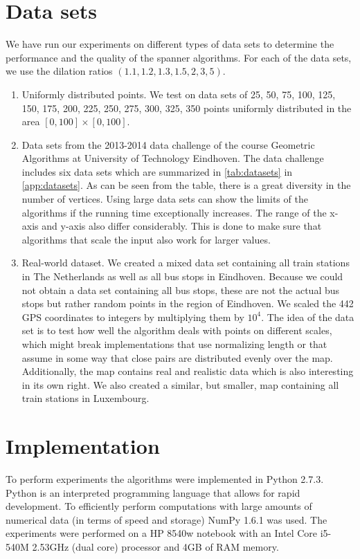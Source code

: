 \documentclass[a4paper,twoside,11pt,hidelinks]{article}
\theoremstyle{plain}
\theoremstyle{definition}  %
\begin{document}
\section{Data sets}
\label{sec:datasets}
We have run our experiments on different types of data sets to determine the performance and the quality of the spanner algorithms. For each of the data sets, we use the dilation ratios $(1.1, 1.2, 1.3, 1.5, 2, 3, 5)$.
\begin{enumerate}
	\item Uniformly distributed points. We test on data sets of 25, 50, 75, 100, 125, 150, 175, 200, 225, 250, 275, 300, 325, 350 points uniformly distributed in the area $[0,100] \times [0,100]$.
    \item Data sets from the 2013-2014 data challenge of the course Geometric
    Algorithms at University of Technology Eindhoven. The data challenge
    includes six data sets which are summarized in \autoref{tab:datasets} in
    \autoref{app:datasets}.
    As can be seen from the table, there is a great diversity in the number of vertices. Using large data sets can show the limits of the algorithms if the running time exceptionally increases. The range of the x-axis and y-axis also differ considerably. This is done to make sure that algorithms that scale the input also work for larger values.
    \item Real-world dataset. We created a mixed data set containing all train stations in The Netherlands as well as all bus stops in Eindhoven. Because we could not obtain a data set containing all bus stops, these are not the actual bus stops but rather random points in the region of Eindhoven. We scaled the 442 GPS coordinates to integers by multiplying them by $10^{4}$. The idea of the data set is to test how well the algorithm deals with points on different scales, which might break implementations that use normalizing length or that assume in some way that close pairs are distributed evenly over the map. Additionally, the map contains real and realistic data which is also interesting in its own right. We also created a similar, but smaller, map containing all train stations in Luxembourg.
\end{enumerate}

\section{Implementation}
\label{sec:implementation}
To perform experiments the algorithms were implemented in Python 2.7.3. Python is an interpreted programming language that allows for rapid development. To efficiently perform computations with large amounts of numerical data (in terms of speed and storage) NumPy 1.6.1 was used. The experiments were performed on a HP 8540w notebook with an Intel Core i5-540M 2.53GHz (dual core) processor and 4GB of RAM memory.
\end{document}
